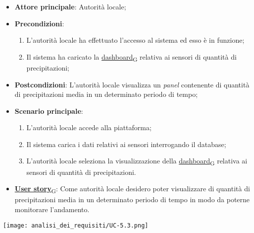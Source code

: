 \begin{itemize}
	\item \textbf{Attore principale}: Autorità locale;
	\item \textbf{Precondizioni}:
	      \begin{enumerate}
		      \item L'autorità locale ha effettuato l'accesso al sistema ed esso è in funzione;
		      \item Il sistema ha caricato la \href{https://7last.github.io/docs/rtb/documentazione-interna/glossario\#dashboard}{dashboard\textsubscript{G}} relativa ai sensori di quantità di precipitazioni;
	      \end{enumerate}
	\item \textbf{Postcondizioni}: L'autorità locale visualizza un \textit{panel} contenente di quantità di precipitazioni media in un determinato periodo di tempo;
	\item \textbf{Scenario principale}:
	      \begin{enumerate}
		      \item L'autorità locale accede alla piattaforma;
		      \item Il sistema carica i dati relativi ai sensori interrogando il database;
		      \item L'autorità locale seleziona la visualizzazione della \href{https://7last.github.io/docs/rtb/documentazione-interna/glossario\#dashboard}{dashboard\textsubscript{G}} relativa ai sensori di quantità di precipitazioni.
	      \end{enumerate}
	\item \href{https://7last.github.io/docs/rtb/documentazione-interna/glossario\#user-story}{\textbf{User story}\textsubscript{G}}: Come autorità locale desidero poter visualizzare di quantità di precipitazioni media in un determinato periodo di tempo
	      in modo da poterne monitorare l'andamento.
\end{itemize}
\begin{center}
	\texttt{[image: analisi\_dei\_requisiti/UC-5.3.png]}
\end{center}

